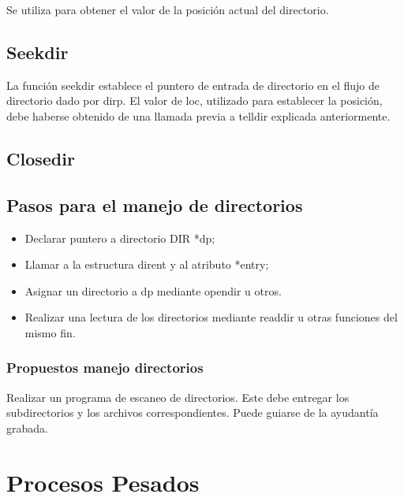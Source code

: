 \documentclass[journal]{IEEEtai}
\begin{document}


Se utiliza para obtener el valor de la posición actual del directorio.

\subsection{Seekdir}



La función seekdir establece el puntero de entrada de directorio en el flujo de directorio dado por dirp. El valor de loc, utilizado para establecer la posición, debe haberse obtenido de una llamada previa a telldir explicada anteriormente.


\subsection{Closedir}



\subsection{Pasos para el manejo de directorios}

\begin{itemize}
\item	Declarar puntero a directorio DIR *dp;
\item	Llamar a la estructura dirent y al atributo *entry;
\item	Asignar un directorio a dp mediante opendir u otros.
\item Realizar una lectura de los directorios mediante readdir u otras funciones del mismo fin.
\end{itemize}



\subsubsection{\textbf{Propuestos manejo directorios}} Realizar un programa de escaneo de directorios. Este debe entregar los subdirectorios y los archivos correspondientes. Puede guiarse de la ayudantía grabada.


\section{Procesos Pesados}
\end{document}
